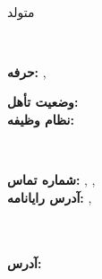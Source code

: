 \documentclass{./../lib/curriculumVitae}
\begin{document}
\iftoggle{Dev}{\par}{}
\noindent\parbox{50mm}
{\parbox{50mm}{\centering\Huge\bfseries\color{cyan}\fullName}\\\parbox{50mm}{\centering متولد \bornData}}\parbox{2mm}{\ }\parbox{138mm}
{\textbf{حرفه:} \ProfessionI, \ProfessionII\\\parbox{40mm}
{\textbf{وضعیت تأهل:} \maritalStatus\\\textbf{نظام وظیفه:} \militaryService}\parbox{2mm}{\ }\parbox{96mm}
{\textbf{شماره تماس:} \mobilePhoneI, \mobilePhoneII, \phoneNumber\\\textbf{آدرس رایانامه:} \emailI, \emailII}}\\\\
\textbf{آدرس:} \fullAddress\\

\descriptions

\education

\workExperience

\teaching

\project

\publication

\LicensesCertifications

\honorsAwards

\training

\languageS

\craft

\voluntary
\end{document}
